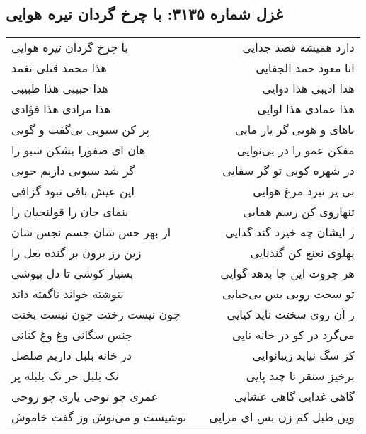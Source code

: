 \begin{center}
\section*{غزل شماره ۳۱۳۵: با چرخ گردان تیره هوایی}
\label{sec:3135}
\begin{longtable}{l p{0.5cm} r}
با چرخ گردان تیره هوایی
&&
دارد همیشه قصد جدایی
\\
هذا محمد قتلی تغمد
&&
انا معود حمد الجفایی
\\
هذا حبیبی هذا طبیبی
&&
هذا ادیبی هذا دوایی
\\
هذا مرادی هذا فؤادی
&&
هذا عمادی هذا لوایی
\\
پر کن سبویی بی‌گفت و گویی
&&
باهای و هویی گر یار مایی
\\
هان ای صفورا بشکن سبو را
&&
مفکن عمو را در بی‌نوایی
\\
گر شد سبویی داریم جویی
&&
در شهره کویی تو گر سقایی
\\
این عیش باقی نبود گزافی
&&
بی پر نپرد مرغ هوایی
\\
بنمای جان را قولنجیان را
&&
تنهاروی کن رسم همایی
\\
از بهر حس شان جسم نجس شان
&&
ز ایشان چه خیزد گند گدایی
\\
زین رز برون بر گنده بغل را
&&
پهلوی نعنع کن گندنایی
\\
بسیار کوشی تا دل بپوشی
&&
هر جزوت این جا بدهد گوایی
\\
ننوشته خواند ناگفته داند
&&
تو سخت رویی بس بی‌حیایی
\\
چون نیست رختت چون نیست بختت
&&
ز آن روی سختت ناید کیایی
\\
جنس سگانی وغ وغ کنانی
&&
می‌گرد در کو در خانه نایی
\\
در خانه بلبل داریم صلصل
&&
کز سگ نیاید زیبانوایی
\\
نک بلبل حر نک بلبله پر
&&
برخیز سنقر تا چند پایی
\\
عمری چو نوحی یاری چو روحی
&&
گاهی غدایی گاهی عشایی
\\
نوشیست و می‌نوش وز گفت خاموش
&&
وین طبل کم زن بس ای مرایی
\\
\end{longtable}
\end{center}
